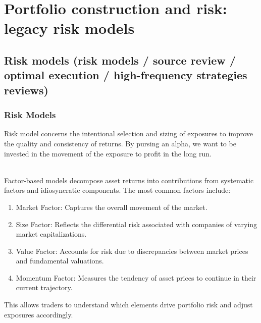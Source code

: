 \documentclass[a4paper,oneside,openany]{book}
\begin{document}
\chapter*{Portfolio construction and risk: legacy risk models}

\section*{Risk models (risk models / source review / optimal execution / high-frequency strategies reviews)}

\subsection*{Risk Models}

Risk model concerns the intentional selection and sizing of exposures to improve the quality and consistency of returns. By pursing an alpha, we want to be invested in the movement of the exposure to profit in the long run.

\begin{method} \\
Factor-based models decompose asset returns into contributions from systematic factors and idiosyncratic components. The most common factors include:
\begin{enumerate}[label=\roman*.]
\setlength{\itemsep}{0pt}
\item Market Factor: Captures the overall movement of the market.
\item Size Factor: Reflects the differential risk associated with companies of varying market capitalizations.
\item Value Factor: Accounts for risk due to discrepancies between market prices and fundamental valuations.
\item Momentum Factor: Measures the tendency of asset prices to continue in their current trajectory.
\end{enumerate}
This allows traders to understand which elements drive portfolio risk and adjust exposures accordingly.
\end{method}
\end{document}
